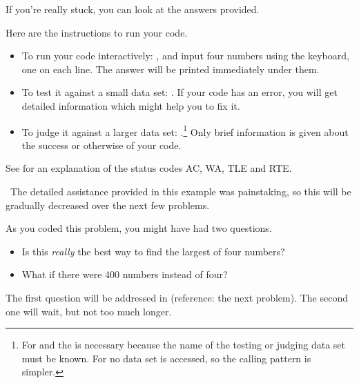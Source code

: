 If you're really stuck, you can look at the answers provided.

Here are the instructions to run your code.
\begin{itemize}
    \item To run your code interactively: , and input four numbers
        using the keyboard, one on each line. The answer will be printed immediately under
        them.
    \item To test it against a small data set: . If
        your code has an error, you will get detailed information which might help you to
        fix it.
    \item To judge it against a larger data set: .\footnote{For  and  the  is
        necessary because the name of the testing or judging data set must be known. For
         no data set is accessed, so the calling pattern is simpler.} Only
        brief information is given about the success or otherwise of your code.
\end{itemize}

See  for an explanation of the status codes AC, WA, TLE and
RTE.

\Afterword\ The detailed assistance provided in this example was painstaking, so this will
be gradually decreased over the next few problems.

As you coded this problem, you might have had two questions.
\begin{itemize}
    \item Is this \emph{really} the best way to find the largest of four numbers?
    \item What if there were 400 numbers instead of four?
\end{itemize}

The first question will be addressed in (reference: the next problem). The second one will
wait, but not too much longer.

